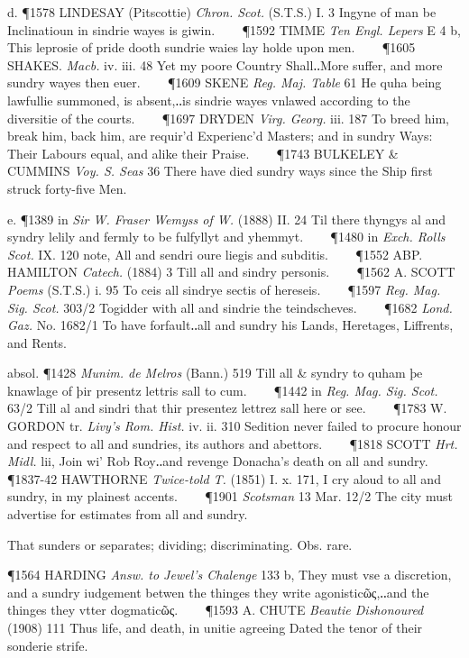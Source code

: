 \begin{description}[wide, labelwidth=!, labelindent=0pt]
\begin{myenumerate}
d. \P 1578 LINDESAY  (Pitscottie) \textit{Chron. Scot.} (S.T.S.) I. 3 Ingyne of man be Inclinatioun in sindrie wayes is giwin.    
\P 1592 TIMME  \textit{Ten Engl. Lepers} E 4 b, This leprosie of pride dooth sundrie waies lay holde upon men.    
\P 1605 SHAKES.  \textit{Macb.} iv. iii. 48 Yet my poore Country Shall‥More suffer, and more sundry wayes then euer.    
\P 1609 SKENE  \textit{Reg. Maj. Table} 61 He quha being lawfullie summoned, is absent,‥is sindrie wayes vnlawed according to the diversitie of the courts.    
\P 1697 DRYDEN  \textit{Virg. Georg.} iii. 187 To breed him, break him, back him, are requir'd Experienc'd Masters; and in sundry Ways: Their Labours equal, and alike their Praise.    
\P 1743 BULKELEY \& CUMMINS  \textit{Voy. S. Seas} 36 There have died sundry ways since the Ship first struck forty-five Men.

e. \P 1389 in  \textit{Sir W. Fraser Wemyss of W.} (1888) II. 24 Til there thyngys al and syndry lelily and fermly to be fulfyllyt and yhemmyt.    
\P 1480 in  \textit{Exch. Rolls Scot.} IX. 120 note, All and sendri oure liegis and subditis.    
\P 1552 ABP. HAMILTON  \textit{Catech.} (1884) 3 Till all and sindry personis.    
\P 1562 A. SCOTT  \textit{Poems} (S.T.S.) i. 95 To ceis all sindrye sectis of hereseis.    
\P 1597  \textit{Reg. Mag. Sig. Scot.} 303/2 Togidder with all and sindrie the teindscheves.    
\P 1682  \textit{Lond. Gaz.} No. 1682/1 To have forfault‥all and sundry his Lands, Heretages, Liffrents, and Rents.

absol. \P 1428 \textit{Munim.  de Melros} (Bann.) 519 Till all \& syndry to quham þe knawlage of þir presentz lettris sall to cum.    
\P 1442 in  \textit{Reg. Mag. Sig. Scot.} 63/2 Till al and sindri that thir presentez lettrez sall here or see.    
\P 1783 W. GORDON tr. \textit{Livy's Rom. Hist.} iv. ii. 310 Sedition never failed to procure honour and respect to all and sundries, its authors and abettors.    
\P 1818 SCOTT  \textit{Hrt. Midl.} lii, Join wi' Rob Roy‥and revenge Donacha's death on all and sundry.    
\P 1837-42 HAWTHORNE  \textit{Twice-told T.} (1851) I. x. 171, I cry aloud to all and sundry, in my plainest accents.    
\P 1901  \textit{Scotsman} 13 Mar. 12/2 The city must advertise for estimates from all and sundry.

 That sunders or separates; dividing; discriminating. Obs. rare.

\P 1564 HARDING  \textit{Answ. to Jewel's Chalenge} 133 b, They must vse a discretion, and a sundry iudgement betwen the thinges they write agonisticῶς,‥and the thinges they vtter dogmaticῶς.    
\P 1593 A. CHUTE  \textit{Beautie Dishonoured} (1908) 111 Thus life, and death, in unitie agreeing Dated the tenor of their sonderie strife.


\end{myenumerate}
\end{description}
